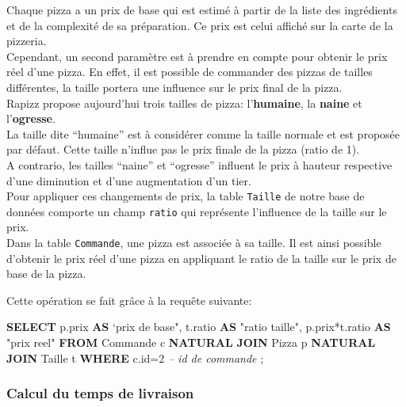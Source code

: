 \documentclass[]{article}
\newenvironment{Shaded}{}{}
\newcommand{\KeywordTok}[1]{\textcolor[rgb]{0.00,0.44,0.13}{\textbf{#1}}}
\newcommand{\DecValTok}[1]{\textcolor[rgb]{0.25,0.63,0.44}{#1}}
\newcommand{\CommentTok}[1]{\textcolor[rgb]{0.38,0.63,0.69}{\textit{#1}}}
\newcommand{\OtherTok}[1]{\textcolor[rgb]{0.00,0.44,0.13}{#1}}
\newcommand{\NormalTok}[1]{#1}
\begin{document}
Chaque pizza a un prix de base qui est estimé à partir de la liste des
ingrédients et de la complexité de sa préparation. Ce prix est celui
affiché sur la carte de la pizzeria.\\
Cependant, un second paramètre est à prendre en compte pour obtenir
le prix réel d'une pizza. En effet, il est possible de commander des
pizzas de tailles différentes, la taille portera une influence sur le
prix final de la pizza.\\
Rapizz propose aujourd'hui trois tailles de pizza: l'\textbf{humaine}, la
\textbf{naine} et l'\textbf{ogresse}.\\
La taille dite ``humaine'' est à considérer comme la taille normale et est
proposée par défaut. Cette taille n'influe pas le prix finale de la pizza
(ratio de 1).\\
A contrario, les tailles ``naine'' et ``ogresse'' influent le prix à
hauteur respective d'une diminution et d'une augmentation d'un tier.\\
Pour appliquer ces changements de prix, la table \texttt{Taille} de
notre base de données comporte un champ \texttt{ratio} qui représente
l'influence de la taille sur le prix.\\
Dans la table \texttt{Commande}, une pizza est associée à sa taille.
Il est ainsi possible d'obtenir le prix réel d'une pizza en appliquant le
ratio de la taille sur le prix de base de la pizza.

Cette opération se fait grâce à la requête suivante:

\begin{Shaded}
    \begin{Highlighting}[]
        \KeywordTok{SELECT}
        \NormalTok{p.prix }\KeywordTok{AS} \OtherTok{`prix de base"}\NormalTok{,}
        \NormalTok{    t.ratio }\KeywordTok{AS} \OtherTok{"ratio taille"}\NormalTok{,}
        \NormalTok{    p.prix*t.ratio }\KeywordTok{AS} \OtherTok{"prix reel"}
        \KeywordTok{FROM}\NormalTok{ Commande c}
        \KeywordTok{NATURAL} \KeywordTok{JOIN}\NormalTok{ Pizza p}
        \KeywordTok{NATURAL} \KeywordTok{JOIN}\NormalTok{ Taille t}
        \KeywordTok{WHERE}\NormalTok{ c.id=}\DecValTok{2} \CommentTok{-- id de commande}
        \NormalTok{;}
    \end{Highlighting}
\end{Shaded}

\subsubsection{Calcul du temps de
    livraison}\label{calcul-du-temps-de-livraison}
\end{document}
